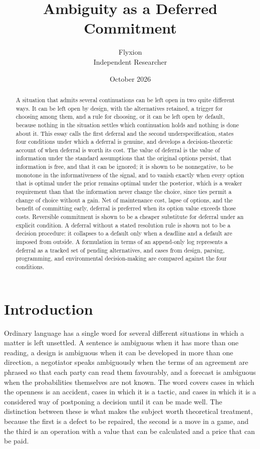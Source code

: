\documentclass[11pt]{article}
\title{Ambiguity as a Deferred Commitment}
\author{Flyxion\\Independent Researcher}
\date{October 2026}
\theoremstyle{remark}
\begin{document}
\maketitle

\begin{abstract}
A situation that admits several continuations can be left open in two quite different ways. It can be left open by design, with the alternatives retained, a trigger for choosing among them, and a rule for choosing, or it can be left open by default, because nothing in the situation settles which continuation holds and nothing is done about it. This essay calls the first deferral and the second underspecification, states four conditions under which a deferral is genuine, and develops a decision-theoretic account of when deferral is worth its cost. The value of deferral is the value of information under the standard assumptions that the original options persist, that information is free, and that it can be ignored; it is shown to be nonnegative, to be monotone in the informativeness of the signal, and to vanish exactly when every option that is optimal under the prior remains optimal under the posterior, which is a weaker requirement than that the information never change the choice, since ties permit a change of choice without a gain. Net of maintenance cost, lapse of options, and the benefit of committing early, deferral is preferred when its option value exceeds those costs. Reversible commitment is shown to be a cheaper substitute for deferral under an explicit condition. A deferral without a stated resolution rule is shown not to be a decision procedure: it collapses to a default only when a deadline and a default are imposed from outside. A formulation in terms of an append-only log represents a deferral as a tracked set of pending alternatives, and cases from design, parsing, programming, and environmental decision-making are compared against the four conditions.
\end{abstract}

\section{Introduction}

Ordinary language has a single word for several different situations in which a matter is left unsettled. A sentence is ambiguous when it has more than one reading, a design is ambiguous when it can be developed in more than one direction, a negotiator speaks ambiguously when the terms of an agreement are phrased so that each party can read them favourably, and a forecast is ambiguous when the probabilities themselves are not known. The word covers cases in which the openness is an accident, cases in which it is a tactic, and cases in which it is a considered way of postponing a decision until it can be made well. The distinction between these is what makes the subject worth theoretical treatment, because the first is a defect to be repaired, the second is a move in a game, and the third is an operation with a value that can be calculated and a price that can be paid.
\end{document}
